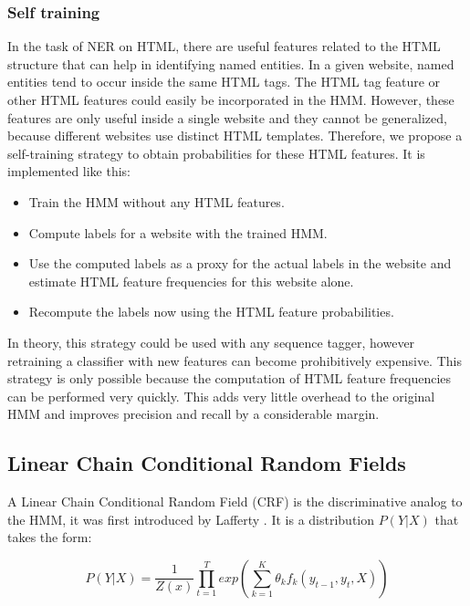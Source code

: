 \documentclass{nle}
\begin{document}
\subsubsection{Self training} 
\label{sssec:self_training}

In the task of NER on HTML, there are useful features related to the HTML
structure that can help in identifying named entities. In a given website, named
entities tend to occur inside the same HTML tags. The HTML tag feature or other
HTML features could easily be incorporated in the HMM. However, these 
features are only useful inside a single website and they cannot be generalized, 
because different websites use distinct HTML templates. 
Therefore, we propose a self-training strategy to obtain probabilities for
these HTML features. It is implemented like this:

\begin{itemize}
\item Train the HMM without any HTML features.
\item Compute labels for a website with the trained HMM.
\item Use the computed labels as a proxy for the actual labels in the 
website and estimate HTML feature frequencies for this website alone.
\item Recompute the labels now using the HTML feature probabilities.
\end{itemize}

In theory, this strategy could be used with any sequence tagger, however
retraining a classifier with new features can become prohibitively expensive.
This strategy is only possible because the computation of HTML feature
frequencies can be performed very quickly. This adds very little overhead 
to the original HMM and improves precision and recall by a considerable 
margin.

\subsection{Linear Chain Conditional Random Fields}

A Linear Chain Conditional Random Field (CRF) is the discriminative analog to the HMM,
it was first introduced by Lafferty . It is a distribution $ P(Y|X) $ that takes the form:

\begin{equation}
P(Y|X) = \frac{1}{Z(x)} \prod_{t=1}^{T} exp \left( \sum_{k=1}^{K} \theta_k f_k(y_{t-1}, y_t, X) \right)
\end{equation}
\\
\end{document}
